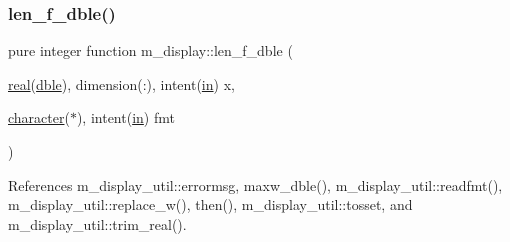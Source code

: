 \subsubsection{\texorpdfstring{len\+\_\+f\+\_\+dble()}{len\_f\_dble()}}
{\footnotesize\ttfamily pure integer function m\+\_\+display\+::len\+\_\+f\+\_\+dble (\begin{DoxyParamCaption}\item[{\hyperlink{read__watch_83_8txt_abdb62bde002f38ef75f810d3a905a823}{real}(\hyperlink{namespacem__display_a46d90b75b6ccef7ccade133e5847e815}{dble}), dimension(\+:), intent(\hyperlink{M__journal_83_8txt_afce72651d1eed785a2132bee863b2f38}{in})}]{x,  }\item[{\hyperlink{option__stopwatch_83_8txt_abd4b21fbbd175834027b5224bfe97e66}{character}($\ast$), intent(\hyperlink{M__journal_83_8txt_afce72651d1eed785a2132bee863b2f38}{in})}]{fmt }\end{DoxyParamCaption})\hspace{0.3cm}{\ttfamily [private]}}



References m\+\_\+display\+\_\+util\+::errormsg, maxw\+\_\+dble(), m\+\_\+display\+\_\+util\+::readfmt(), m\+\_\+display\+\_\+util\+::replace\+\_\+w(), then(), m\+\_\+display\+\_\+util\+::tosset, and m\+\_\+display\+\_\+util\+::trim\+\_\+real().

